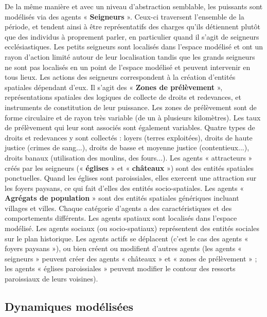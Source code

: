 \documentclass[12pt, a4paper, oneside]{book}
\begin{document}
	De la même manière et avec un niveau d'abstraction semblable, les puissants sont modélisés via des agents « \textbf{Seigneurs} ».
	Ceux-ci traversent l'ensemble de la période, et tendent ainsi à être représentatifs des charges qu'ils détiennent plutôt que des individus à proprement parler, en particulier quand il s'agit de seigneurs ecclésiastiques.
	Les petits seigneurs sont localisés dans l'espace modélisé et ont un rayon d'action limité autour de leur localisation tandis que les grands seigneurs ne sont pas localisés en un point de l'espace modélisé et peuvent intervenir en tous lieux.
	Les actions des seigneurs correspondent à la création d'entités spatiales dépendant d'eux.
	Il s'agit des « \textbf{Zones de prélèvement} », représentations spatiales des logiques de collecte de droits et redevances, et instruments de constitution de leur puissance.
	Les zones de prélèvement sont de forme circulaire et de rayon très variable (de un à plusieurs kilomètres).
	Les taux de prélèvement qui leur sont associés sont également variables. 
	Quatre types de droits et redevances y sont collectés : loyers (terres exploitées), droits de haute justice (crimes de sang...), droits de basse et moyenne justice (contentieux...), droits banaux (utilisation des moulins, des fours...).
	Les agents « attracteurs » créés par les seigneurs (« \textbf{églises} » et « \textbf{châteaux} ») sont des entités spatiales ponctuelles.
	Quand les églises sont paroissiales, elles exercent une attraction sur les foyers paysans, ce qui fait d'elles des entités socio-spatiales.
	Les agents « \textbf{Agrégats de population} » sont des entités spatiales génériques incluant villages et villes.
	Chaque catégorie d'agents a des caractéristiques et des comportements
	différents.
	Les agents spatiaux sont localisés dans l'espace modélisé.
	Les agents sociaux (ou socio-spatiaux) représentent des entités sociales sur le plan historique.
	Les agents actifs se déplacent (c'est le cas des agents « foyers paysans »), ou bien créent ou modifient d'autres agents (les agents « seigneurs » peuvent créer des agents « châteaux » et « zones de prélèvement » ; les agents « églises paroissiales » peuvent modifier le contour des ressorts paroissiaux de leurs voisines).
	
	\subsection{Dynamiques modélisées}
	
\end{document}
